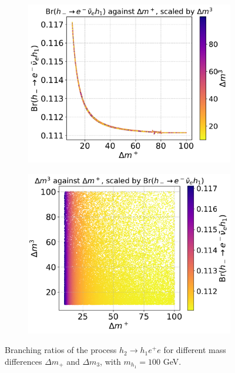 \documentclass[12pt]{article}
\begin{document}
\begin{figure}[H]
\begin{subfigure}[b]{0.49\textwidth}
        \includegraphics[width=\textwidth]{branching_ratio_plots/Br__h_-__rightarrow_e_-__bar__nu__e_h_1____Delta_m____scale___Delta_m_3_.pdf}
        \caption{}
        \label{fig:Br(h2ee),Br_scale}
    \end{subfigure}
        \hfill
    \begin{subfigure}[b]{0.49\textwidth}
        \includegraphics[width=\textwidth]{branching_ratio_plots/__Delta_m_3___Delta_m____scale_Br__h_-__rightarrow_e_-__bar__nu__e_h_1__.pdf}
        \caption{}
        \label{fig:Br(h2ee),Br_scale}
    \end{subfigure}
    \caption{Branching ratios of the process $h_2 \rightarrow h_1 e^+e$ for different mass differences $\Delta m_+$ and $\Delta m_3$, with $m_{h_1} =100$ GeV.}
    \label{fig:Br(h2ee)}
\end{figure}
\end{document}
